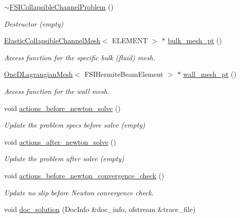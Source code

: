 \begin{DoxyCompactItemize}
\hyperlink{classFSICollapsibleChannelProblem_abe33aaaae15ea3eb10885527a1d1ad9a}{$\sim$\+F\+S\+I\+Collapsible\+Channel\+Problem} ()
\begin{DoxyCompactList}\small\item\em Destructor (empty) \end{DoxyCompactList}\item 
\hyperlink{classElasticCollapsibleChannelMesh}{Elastic\+Collapsible\+Channel\+Mesh}$<$ E\+L\+E\+M\+E\+NT $>$ $\ast$ \hyperlink{classFSICollapsibleChannelProblem_a90bfc02608e7fa6a69b14b6d5cfb939e}{bulk\+\_\+mesh\+\_\+pt} ()
\begin{DoxyCompactList}\small\item\em Access function for the specific bulk (fluid) mesh. \end{DoxyCompactList}\item 
\hyperlink{classoomph_1_1OneDLagrangianMesh}{One\+D\+Lagrangian\+Mesh}$<$ F\+S\+I\+Hermite\+Beam\+Element $>$ $\ast$ \hyperlink{classFSICollapsibleChannelProblem_ae8b71da8da82f3c52387052ce400b930}{wall\+\_\+mesh\+\_\+pt} ()
\begin{DoxyCompactList}\small\item\em Access function for the wall mesh. \end{DoxyCompactList}\item 
void \hyperlink{classFSICollapsibleChannelProblem_ad10b2d12be052c6b1bc5005dc27cd229}{actions\+\_\+before\+\_\+newton\+\_\+solve} ()
\begin{DoxyCompactList}\small\item\em Update the problem specs before solve (empty) \end{DoxyCompactList}\item 
void \hyperlink{classFSICollapsibleChannelProblem_a49780267c05f4c6ecbed11bfc6b9956b}{actions\+\_\+after\+\_\+newton\+\_\+solve} ()
\begin{DoxyCompactList}\small\item\em Update the problem after solve (empty) \end{DoxyCompactList}\item 
void \hyperlink{classFSICollapsibleChannelProblem_ace5343d2e6e6e0480d077d4f17365288}{actions\+\_\+before\+\_\+newton\+\_\+convergence\+\_\+check} ()
\begin{DoxyCompactList}\small\item\em Update no slip before Newton convergence check. \end{DoxyCompactList}\item 
void \hyperlink{classFSICollapsibleChannelProblem_aff5cacbc8d81f6c1beda947085496462}{doc\+\_\+solution} (Doc\+Info \&doc\+\_\+info, ofstream \&trace\+\_\+file)

\end{DoxyCompactItemize}
